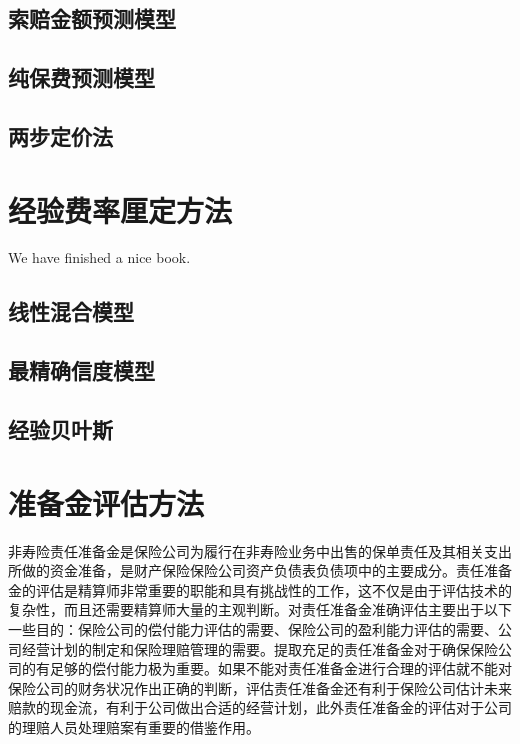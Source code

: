 \documentclass[
]{book}
\begin{document}
\hypertarget{ux7d22ux8d54ux91d1ux989dux9884ux6d4bux6a21ux578b}{%
\section{索赔金额预测模型}\label{ux7d22ux8d54ux91d1ux989dux9884ux6d4bux6a21ux578b}}

\hypertarget{ux7eafux4fddux8d39ux9884ux6d4bux6a21ux578b}{%
\section{纯保费预测模型}\label{ux7eafux4fddux8d39ux9884ux6d4bux6a21ux578b}}

\hypertarget{ux4e24ux6b65ux5b9aux4ef7ux6cd5}{%
\section{两步定价法}\label{ux4e24ux6b65ux5b9aux4ef7ux6cd5}}

\hypertarget{experiencerate}{%
\chapter{经验费率厘定方法}\label{experiencerate}}

We have finished a nice book.

\hypertarget{ux7ebfux6027ux6df7ux5408ux6a21ux578b}{%
\section{线性混合模型}\label{ux7ebfux6027ux6df7ux5408ux6a21ux578b}}

\hypertarget{ux6700ux7cbeux786eux4fe1ux5ea6ux6a21ux578b}{%
\section{最精确信度模型}\label{ux6700ux7cbeux786eux4fe1ux5ea6ux6a21ux578b}}

\hypertarget{ux7ecfux9a8cux8d1dux53f6ux65af}{%
\section{经验贝叶斯}\label{ux7ecfux9a8cux8d1dux53f6ux65af}}

\hypertarget{reserv}{%
\chapter{准备金评估方法}\label{reserv}}

非寿险责任准备金是保险公司为履行在非寿险业务中出售的保单责任及其相关支出所做的资金准备，是财产保险保险公司资产负债表负债项中的主要成分。责任准备金的评估是精算师非常重要的职能和具有挑战性的工作，这不仅是由于评估技术的复杂性，而且还需要精算师大量的主观判断。对责任准备金准确评估主要出于以下一些目的：保险公司的偿付能力评估的需要、保险公司的盈利能力评估的需要、公司经营计划的制定和保险理赔管理的需要。提取充足的责任准备金对于确保保险公司的有足够的偿付能力极为重要。如果不能对责任准备金进行合理的评估就不能对保险公司的财务状况作出正确的判断，评估责任准备金还有利于保险公司估计未来赔款的现金流，有利于公司做出合适的经营计划，此外责任准备金的评估对于公司的理赔人员处理赔案有重要的借鉴作用。
\end{document}

